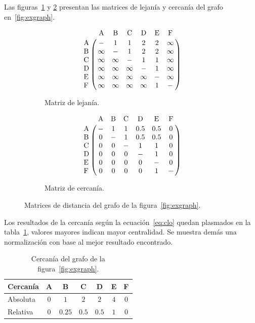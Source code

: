 Las figuras~\ref{fig:closs:lej} y \ref{fig:closs:cer} presentan las matrices de
lejanía y cercanía del grafo en~\ref{fig:exgraph}.
\begin{figure}[htpb]
  \centering
  \begin{subfigure}[b]{.4\textwidth}
    \begin{equation*}
      \bordermatrix{
         ~  &   $A$  &   $B$  &   $C$  &   $D$  &   $E$  &   $F$  \cr
        $A$ & -      & 1      & 1      & 2      & 2      & \infty \cr
        $B$ & \infty & -      & 1      & 2      & 2      & \infty \cr
        $C$ & \infty & \infty & -      & 1      & 1      & \infty \cr
        $D$ & \infty & \infty & \infty & -      & 1      & \infty \cr
        $E$ & \infty & \infty & \infty & \infty & -      & \infty \cr
        $F$ & \infty & \infty & \infty & \infty & 1      & -      \cr
      }
    \end{equation*}
    \caption{Matriz de lejanía.}
    \label{fig:closs:lej}
  \end{subfigure}
  \begin{subfigure}[b]{.4\textwidth}
    \begin{equation*}
      \bordermatrix{
       ~  & $A$ & $B$ & $C$ & $D$ & $E$ & $F$ \cr
      $A$ &  -  &  1  &  1  & 0.5 & 0.5 &  0  \cr
      $B$ &  0  &  -  &  1  & 0.5 & 0.5 &  0  \cr
      $C$ &  0  &  0  &  -  &  1  &  1  &  0  \cr
      $D$ &  0  &  0  &  0  &  -  &  1  &  0  \cr
      $E$ &  0  &  0  &  0  &  0  &  -  &  0  \cr
      $F$ &  0  &  0  &  0  &  0  &  1  &  -  \cr
    }
    \end{equation*}
    \caption{Matriz de cercanía.}
    \label{fig:closs:cer}
  \end{subfigure}
  \caption{Matrices de distancia del grafo de la figura~\ref{fig:exgraph}.}
  \label{fig:closs}
\end{figure}

Los resultados de la cercanía según la ecuación~\ref{eq:clo}
quedan plasmados en la tabla~\ref{tab:closeness},
valores mayores indican mayor centralidad. Se muestra demás una normalización
con base al mejor resultado encontrado.
\begin{table}[htpb]
  \centering
  \begin{tabular}{|l|c|c|c|c|c|c|}
    \hline
    Cercanía &  A  &  B  &  C  &  D  &  E  &  F  \\\hline
    Absoluta & $0$ & $1$ & $2$ & $2$ & $4$ & $0$ \\\hline
    Relativa & $0$ & $0.25$ & $0.5$ & $0.5$ & $1$ & $0$ \\\hline
  \end{tabular}
  \caption{Cercanía del grafo de la figura~\ref{fig:exgraph}.}
  \label{tab:closeness}
\end{table}

